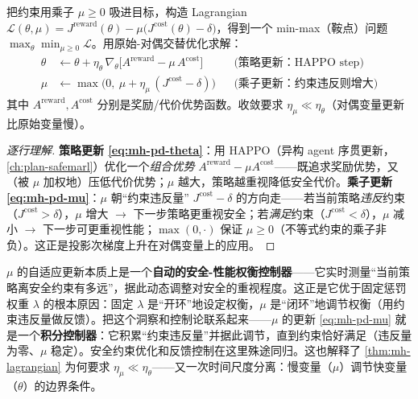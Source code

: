 \begin{theorem}\label{thm:mh-lagrangian}
把约束用乘子 $\mu\ge0$ 吸进目标，构造 Lagrangian $\mathcal{L}(\theta,\mu)=J^{\text{reward}}(\theta)-\mu\big(J^{\text{cost}}(\theta)-\delta\big)$，得到一个 min-max（鞍点）问题 $\max_\theta\min_{\mu\ge0}\mathcal{L}$。用原始-对偶交替优化求解：
\begin{align}
  \theta &\leftarrow \theta+\eta_\theta\,\nabla_\theta\big[A^{\text{reward}}-\mu\,A^{\text{cost}}\big] &&\text{(策略更新：HAPPO step)}\label{eq:mh-pd-theta}\\
  \mu &\leftarrow \max\!\big(0,\ \mu+\eta_\mu\,(J^{\text{cost}}-\delta)\big) &&\text{(乘子更新：约束违反则增大)}\label{eq:mh-pd-mu}
\end{align}
其中 $A^{\text{reward}},A^{\text{cost}}$ 分别是奖励/代价优势函数。收敛要求 $\eta_\mu\ll\eta_\theta$（对偶变量更新比原始变量慢）。
\end{theorem}
\begin{proof}[逐行理解]
\textbf{策略更新 \cref{eq:mh-pd-theta}}：用 HAPPO（异构 agent 序贯更新，\cref{ch:plan-safemarl}）优化一个\emph{组合优势} $A^{\text{reward}}-\mu A^{\text{cost}}$——既追求奖励优势，又（被 $\mu$ 加权地）压低代价优势；$\mu$ 越大，策略越重视降低安全代价。\textbf{乘子更新 \cref{eq:mh-pd-mu}}：$\mu$ 朝“约束违反量” $J^{\text{cost}}-\delta$ 的方向走——若当前策略\emph{违反}约束（$J^{\text{cost}}>\delta$），$\mu$ 增大 $\to$ 下一步策略更重视安全；若\emph{满足}约束（$J^{\text{cost}}<\delta$），$\mu$ 减小 $\to$ 下一步可更重视性能；$\max(0,\cdot)$ 保证 $\mu\ge0$（不等式约束的乘子非负）。这正是投影次梯度上升在对偶变量上的应用。
\end{proof}

\begin{insight}
$\mu$ 的自适应更新本质上是一个\textbf{自动的安全-性能权衡控制器}——它实时测量“当前策略离安全约束有多远”，据此动态调整对安全的重视程度。这正是它优于固定惩罚权重 $\lambda$ 的根本原因：固定 $\lambda$ 是“开环”地设定权衡，$\mu$ 是“闭环”地调节权衡（用约束违反量做反馈）。把这个洞察和控制论联系起来——$\mu$ 的更新 \cref{eq:mh-pd-mu} 就是一个\textbf{积分控制器}：它积累“约束违反量”并据此调节，直到约束恰好满足（违反量为零、$\mu$ 稳定）。安全约束优化和反馈控制在这里殊途同归。这也解释了 \cref{thm:mh-lagrangian} 为何要求 $\eta_\mu\ll\eta_\theta$——又一次时间尺度分离：慢变量（$\mu$）调节快变量（$\theta$）的边界条件。
\end{insight}

